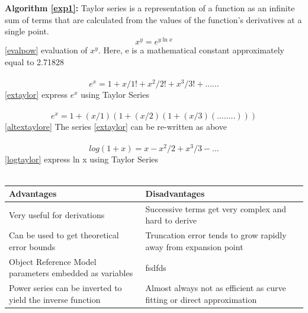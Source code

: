 \documentclass[11pt, english]{report}
\begin{document}
\textbf{\\ \\ Algorithm \ref{exp1}:} Taylor series is a representation of a function as an infinite sum of terms that are calculated from the values of the function's derivatives at a single point. 
\begin{equation} \label{evalpow}
x^y= e^{y\ln x}
\end{equation}
\ref{evalpow} evaluation of $x^y$. Here, e is a mathematical constant approximately equal to  2.71828\\ \\

\begin{equation} \label{extaylor}
e^x = 1 + x/1! + x^2/2! + x^3/3! + ...... 
\end{equation}
\ref{extaylor} express $e^x$ using Taylor Series\\ \\


\begin{equation} \label{altextaylore}
e^x = 1 + (x/1) (1 + (x/2) (1 + (x/3) (........) ) ) 
\end{equation}
\ref{altextaylore} The series \ref{extaylor} can be re-written as above\\ \\


\begin{equation} \label{logtaylor}
log(1+x) = x-x^2/2 + x^3/3- ... 
\end{equation}
\ref{logtaylor} express ln x using Taylor Series\\ \\

\setlength{\tabcolsep}{18pt}
\renewcommand{\arraystretch}{1.5}
\begin{tabular}{ |p{6cm}|p{6cm}| }
\hline
\textbf{Advantages} & \textbf{Disadvantages}\\ \hline 
Very useful for derivations
 & Successive terms get very complex and hard to derive\\
\hline
Can be used to get theoretical error bounds &Truncation error tends to grow rapidly away from expansion point\\
\hline
Object Reference Model parameters embedded as variables & fsdfds\\
\hline
Power series can be inverted to yield the inverse function & Almost always not as efficient as curve fitting or direct approximation\\
\hline
\end{tabular} \\ \\ \\ 
\end{document}
